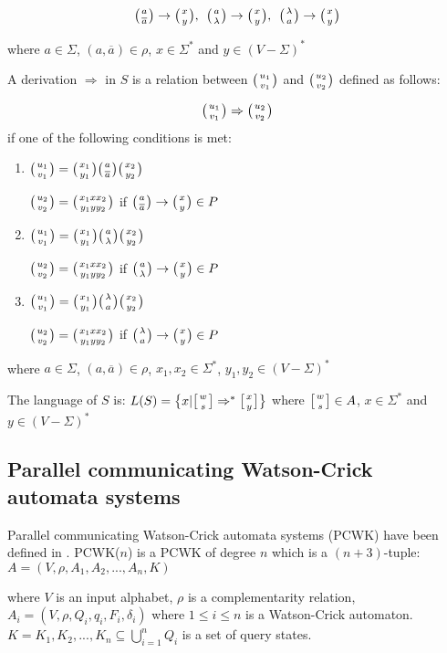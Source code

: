 $$\wkpair{a}{\overline{a}} \rightarrow \wkpair{x}{y}, \:\: \wkpair{a}{\lambda} \rightarrow \wkpair{x}{y},\:\: \wkpair{\lambda}{a} \rightarrow \wkpair{x}{y}$$

where $a \in \Sigma$, $(a, \overline{a}) \in \rho$, $x \in \Sigma^*$ and $y \in (V - \Sigma)^*$

A derivation $\Rightarrow$ in $S$ is a relation between $\wkpair{u_1}{v_1}$ and $\wkpair{u_2}{v_2}$ defined as follows:

$$\wkpair{u_1}{v_1} \Rightarrow \wkpair{u_2}{v_2}$$ if one of the following conditions is met:

\begin{enumerate}
  \item{$\wkpair{u_1}{v_1} = \wkpair{x_1}{y_1} \wkpair{a}{\overline{a}} \wkpair{x_2}{y_2}$

  $\wkpair{u_2}{v_2} = \wkpair{x_1xx_2}{y_1yy_2}$ if $\wkpair{a}{\overline{a}} \rightarrow \wkpair{x}{y} \in P$
  }

  \item{$\wkpair{u_1}{v_1} = \wkpair{x_1}{y_1} \wkpair{a}{\lambda} \wkpair{x_2}{y_2}$

  $\wkpair{u_2}{v_2} = \wkpair{x_1xx_2}{y_1yy_2}$ if $\wkpair{a}{\lambda} \rightarrow \wkpair{x}{y} \in P$
  }

  \item{$\wkpair{u_1}{v_1} = \wkpair{x_1}{y_1} \wkpair{\lambda}{a} \wkpair{x_2}{y_2}$

  $\wkpair{u_2}{v_2} = \wkpair{x_1xx_2}{y_1yy_2}$ if $\wkpair{\lambda}{a} \rightarrow \wkpair{x}{y} \in P$
  }

\end{enumerate}

where $a \in \Sigma$, $(a, \overline{a}) \in \rho$, $x_1, x_2 \in \Sigma^*$, $y_1, y_2 \in (V - \Sigma)^*$

The language of $S$ is: $L(S) = \big\{x| \wkdomain{w}{s} \Rightarrow^* \wkdomain{x}{y} \big\}$ where $\wkdomain{w}{s} \in A$, $x \in \Sigma^*$ and $y \in (V - \Sigma)^*$

\subsection{Parallel communicating Watson-Crick automata systems}
Parallel communicating Watson-Crick automata systems (PCWK) have been defined in \cite{PARALLEL}. PCWK($n$) is a PCWK of degree $n$ which is a $(n + 3)$-tuple: $A = (V, \rho, A_1, A_2, ..., A_n, K)$

where $V$ is an input alphabet, $\rho$ is a complementarity relation, $A_i = (V, \rho, Q_i, q_i, F_i, \delta_i)$ where $1 \leq i \leq n$ is a Watson-Crick automaton. $K = {K_1, K_2, ..., K_n} \subseteq \bigcup_{i=1}^{n} Q_i$ is a set of query states.


